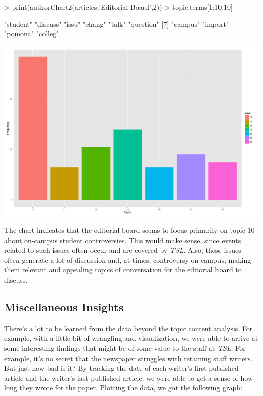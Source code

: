 \documentclass[a4paper]{article}
\begin{document}
\begin{Schunk}
\begin{Sinput}
> print(authorChart2(articles,'Editorial Board',2))
> topic.terms[1:10,10]
\end{Sinput}
\begin{Soutput}
 [1] "student"  "discuss"  "issu"     "chang"    "talk"     "question"
 [7] "campus"   "import"   "pomona"   "colleg"  
\end{Soutput}
\end{Schunk}
\includegraphics{FinalProject-012}

The chart indicates that the editorial board seems to focus primarily on topic 10 about on-campus student controversies. This would make sense, since events related to such issues often occur and are covered by \textit{TSL}. Also, these issues often generate a lot of discussion and, at times, controversy on campus, making them relevant and appealing topics of conversation for the editorial board to discuss.

\subsection{Miscellaneous Insights}


There's a lot to be learned from the data beyond the topic content analysis. For example, with a little bit of wrangling and visualization, we were able to arrive at some interesting findings that might be of some value to the staff at \textit{TSL}. For example, it's no secret that the newspaper struggles with retaining staff writers. But just how bad is it? By tracking the date of each writer's first published article and the writer's last published article, we were able to get a sense of how long they wrote for the paper. Plotting the data, we got the following graph:
\end{document}
